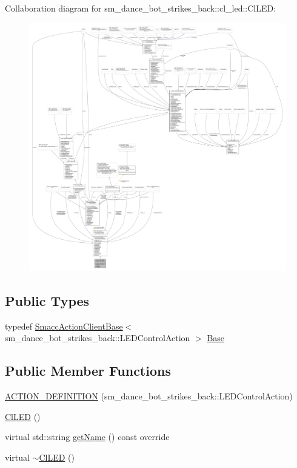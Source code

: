Collaboration diagram for sm\+\_\+dance\+\_\+bot\+\_\+strikes\+\_\+back\+:\+:cl\+\_\+led\+:\+:Cl\+L\+ED\+:
\nopagebreak
\begin{figure}[H]
\begin{center}
\leavevmode
\includegraphics[width=350pt]{classsm__dance__bot__strikes__back_1_1cl__led_1_1ClLED__coll__graph}
\end{center}
\end{figure}
\subsection*{Public Types}
\begin{DoxyCompactItemize}
\item 
typedef \hyperlink{classsmacc_1_1client__bases_1_1SmaccActionClientBase_af38f27dd26f8a87fea6b3eaa4a84e604}{Smacc\+Action\+Client\+Base}$<$ sm\+\_\+dance\+\_\+bot\+\_\+strikes\+\_\+back\+::\+L\+E\+D\+Control\+Action $>$ \hyperlink{classsm__dance__bot__strikes__back_1_1cl__led_1_1ClLED_a9f481fe673daa33e8e66b6f92ca510ed}{Base}
\end{DoxyCompactItemize}
\subsection*{Public Member Functions}
\begin{DoxyCompactItemize}
\item 
\hyperlink{classsm__dance__bot__strikes__back_1_1cl__led_1_1ClLED_ad609de3f0785f2e8b19e347d0a337555}{A\+C\+T\+I\+O\+N\+\_\+\+D\+E\+F\+I\+N\+I\+T\+I\+ON} (sm\+\_\+dance\+\_\+bot\+\_\+strikes\+\_\+back\+::\+L\+E\+D\+Control\+Action)
\item 
\hyperlink{classsm__dance__bot__strikes__back_1_1cl__led_1_1ClLED_adcaf1598cb6294ccde342d9604725c5b}{Cl\+L\+ED} ()
\item 
virtual std\+::string \hyperlink{classsm__dance__bot__strikes__back_1_1cl__led_1_1ClLED_aa774d43fe5a936b4bf292cb5447becd9}{get\+Name} () const override
\item 
virtual \hyperlink{classsm__dance__bot__strikes__back_1_1cl__led_1_1ClLED_a9365ecafd1b632f48c200b18afab0c7f}{$\sim$\+Cl\+L\+ED} ()
\end{DoxyCompactItemize}
